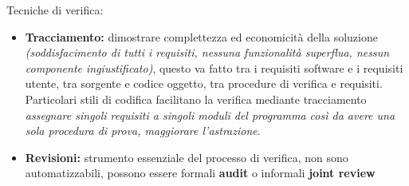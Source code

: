 Tecniche di verifica:
\begin{itemize}
	\item \textbf{Tracciamento:} dimostrare complettezza ed economicità della soluzione \textit{(soddisfacimento di tutti i requisiti, nessuna funzionalità superflua, nessun componente ingiustificato)}, questo va fatto tra i requisiti software e i requisiti utente, tra sorgente e codice oggetto, tra procedure di verifica e requisiti.\\
	Particolari stili di codifica facilitano la verifica mediante tracciamento \textit{assegnare singoli requisiti a singoli moduli del programma così da avere una sola procedura di prova, maggiorare l'astrazione}.
	\item \textbf{Revisioni:} strumento essenziale del processo di verifica, non sono automatizzabili, possono essere formali \textbf{audit} o informali \textbf{joint review}

\end{itemize}

